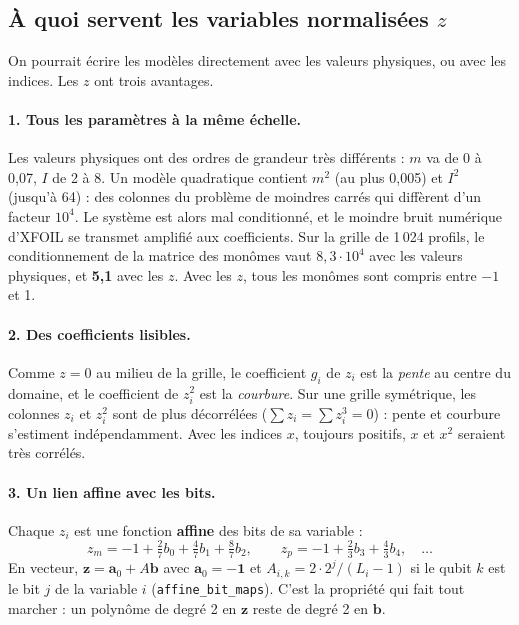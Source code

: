 \subsection{À quoi servent les variables normalisées $z$}
On pourrait écrire les modèles directement avec les valeurs physiques, ou avec les indices. Les $z$ ont trois avantages.

\paragraph{1. Tous les paramètres à la même échelle.} Les valeurs physiques ont des ordres de grandeur très différents : $m$ va de 0 à 0,07, $I$ de 2 à 8. Un modèle quadratique contient $m^2$ (au plus 0,005) et $I^2$ (jusqu'à 64) : des colonnes du problème de moindres carrés qui diffèrent d'un facteur $10^4$. Le système est alors mal conditionné, et le moindre bruit numérique d'XFOIL se transmet amplifié aux coefficients. Sur la grille de 1\,024 profils, le conditionnement de la matrice des monômes vaut $8{,}3\cdot10^4$ avec les valeurs physiques, et \textbf{5,1} avec les $z$. Avec les $z$, tous les monômes sont compris entre $-1$ et 1.

\paragraph{2. Des coefficients lisibles.} Comme $z=0$ au milieu de la grille, le coefficient $g_i$ de $z_i$ est la \emph{pente} au centre du domaine, et le coefficient de $z_i^2$ est la \emph{courbure}. Sur une grille symétrique, les colonnes $z_i$ et $z_i^2$ sont de plus décorrélées ($\sum z_i=\sum z_i^3=0$) : pente et courbure s'estiment indépendamment. Avec les indices $x$, toujours positifs, $x$ et $x^2$ seraient très corrélés.

\paragraph{3. Un lien affine avec les bits.} Chaque $z_i$ est une fonction \textbf{affine} des bits de sa variable :
\[ z_m=-1+\tfrac27b_0+\tfrac47b_1+\tfrac87b_2,\qquad z_p=-1+\tfrac23b_3+\tfrac43b_4,\quad\dots \]
En vecteur, $\mathbf z=\mathbf a_0+A\mathbf b$ avec $\mathbf a_0=-\mathbf1$ et $A_{i,k}=2\cdot2^j/(L_i-1)$ si le qubit $k$ est le bit $j$ de la variable $i$ (\texttt{affine\_bit\_maps}). C'est la propriété qui fait tout marcher : un polynôme de degré 2 en $\mathbf z$ reste de degré 2 en $\mathbf b$.

